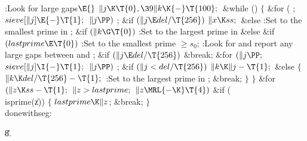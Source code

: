 \Y\B\4:Look for large gaps\X${}\E{}$\6
$\|j\K\T{0},\39\|k\K{-}\T{100};{}$\6
\&{while} ()\5
${}\{{}$\1\6
\&{for} ( ; ${}\\{sieve}[\|j]\E{-}\T{1};{}$ ${}\|j\PP){}$\1\5
;\2\6
\&{if} ${}(\|j\E\\{del}/\T{256}){}$\1\5
${}\|x\K\\{ss};{}$\2\6
\&{else}\1\5
:Set  to the smallest prime in \X;\2\6
\&{if} ${}(\|k\G\T{0}){}$\1\5
:Set  to the largest prime in \X\2\6
\&{else} \&{if} ${}(\\{lastprime}\E\T{0}){}$\1\5
:Set  to the smallest prime $\ge s_0$\X;\2\6
:Look for and report any large gaps between  and %
\X;\6
\&{if} ${}(\|j\E\\{del}/\T{256}){}$\1\5
\&{break};\2\6
\&{for} ${}(\|j\PP;{}$ ${}\\{sieve}[\|j]\I{-}\T{1};{}$ ${}\|j\PP){}$\1\5
;\2\6
\&{if} ${}(\|j<\\{del}/\T{256}){}$\1\5
${}\|k\K\|j-\T{1};{}$\2\6
\&{else}\5
${}\{{}$\1\6
${}\|k\K\\{del}/\T{256}-\T{1};{}$\6
:Set  to the largest prime in \X;\6
\&{break};\6
\4${}\}{}$\2\6
\4${}\}{}$\2\6
\&{for} ${}(\|z\K\\{ss}-\T{1};{}$ ${}\|z>\\{lastprime};{}$ ${}\|z\MRL{-{\K}}%
\T{4}){}$\1\6
\&{if} (\\{isprime}(\|z))\5
${}\{{}$\1\6
${}\\{lastprime}\K\|z{}$;\5
\&{break};\6
\4${}\}{}$\2\2\6
\4\\{donewithseg}:\par
\U8.\fi

